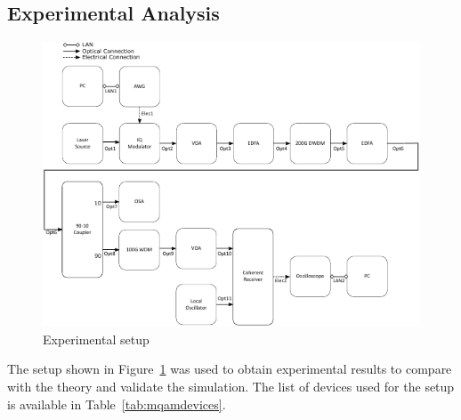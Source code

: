 \begin{refsection}
\subsection*{Experimental Analysis}
\begin{figure}[H]
	\centering
	\includegraphics[width=\textwidth]{./sdf/m_qam_system/figures/mqamExperimental20180321.pdf}
	\caption{Experimental setup}
	\label{fig:experimental_mqam_setup}
\end{figure}

The setup shown in Figure~\ref{fig:experimental_mqam_setup} was used to obtain experimental results to compare with the theory and validate the simulation. The list of devices used for the setup is available in Table~\ref{tab:mqamdevices}.



\end{refsection}
